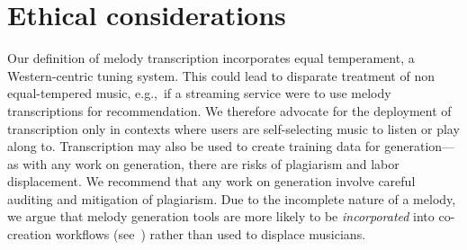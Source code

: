 \vspace{-3mm}
\section{Ethical considerations}

Our definition of melody transcription incorporates equal temperament, a Western-centric tuning system. 
This could lead to disparate treatment of non equal-tempered music, e.g.,~if a streaming service were to use melody transcriptions for recommendation. 
We therefore advocate for the deployment of transcription only in contexts where users are self-selecting music to listen or play along to. 
Transcription may also be used to create training data for generation---as with any work on generation, there are risks of plagiarism and labor displacement. 
We recommend that any work on generation involve careful auditing and mitigation of plagiarism. 
Due to the incomplete nature of a melody, we argue that melody generation tools are more likely to be \emph{incorporated} into co-creation workflows (see~\cite{huang2020ai}) rather than used to displace musicians.